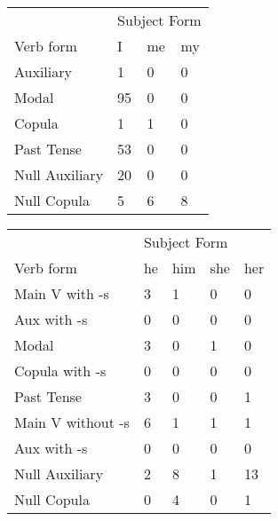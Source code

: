 \begin{table}[]
\begin{minipage}{0.5\textwidth}
    \centering
    \begin{tabular}{@{}llll@{}}
        \toprule
            &\multicolumn{3}{l}{Subject Form}\\
            \cline{2-4}
        Verb form & I & me & my \\
        \midrule
        Auxiliary & 1 & 0 & 0 \\
        Modal & 95 & 0 & 0 \\
        Copula & 1 & 1 & 0 \\
        Past Tense & 53 & 0 & 0 \\
        \hline
        Null Auxiliary & 20 & 0 & 0 \\
        Null Copula & 5 & 6 & 8 \\
        \bottomrule
    \end{tabular}
\end{minipage}
\begin{minipage}{0.5\textwidth}
    \centering
    \begin{tabular}{@{}lllll@{}}
        \toprule
            &\multicolumn{4}{l}{Subject Form}\\
            \cline{2-5}
        Verb form & he & him & she & her \\
        \midrule
        Main V with -s & 3 & 1 & 0 & 0 \\
        Aux with -s & 0 & 0 & 0 & 0 \\
        Modal & 3 & 0 & 1 & 0 \\
        Copula with -s & 0 & 0 & 0 & 0 \\
        Past Tense & 3 & 0 & 0 & 1 \\
        \hline
        Main V without -s & 6 & 1 & 1 & 1 \\
        Aux with -s & 0 & 0 & 0 & 0 \\
        Null Auxiliary & 2 & 8 & 1 & 13 \\
        Null Copula & 0 & 4 & 0 & 1 \\
        \bottomrule
    \end{tabular}
    \end{minipage}
\end{table}
